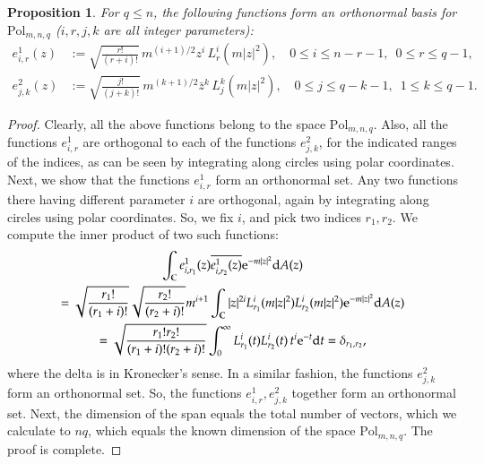 \documentclass{birkart}
\newtheorem{prop}[thm]{Proposition}
\theoremstyle{definition}
\theoremstyle{remark}
\numberwithin{equation}{section}
\numberwithin{figure}{section}
\newcommand{\e}{\mathrm e}
\newcommand{\1}{{\mathbf 1}}
\newcommand{\Rpar}{q}
\newcommand{\C}{{\mathbb C}}
\newcommand{\diff}{{\mathrm d}}
\begin{document}
\begin{prop} \label{on-kanta}
For $\Rpar\le n$, the following functions form an orthonormal basis for 
$\mathrm{Pol}_{m,n,\Rpar}$ ($i,r,j,k$ are all integer parameters): 
\begin{align*} 
e_{i,r}^{1}(z)&:=\sqrt{\frac{r!}{(r+i)!}} \,m^{(i+1)/2}z^i\, L_r^{i}(m|z|^2), 
\quad 0\leq i\leq n-r-1,\,\,\,0\leq r\leq\Rpar-1, 
\\
e_{j,k}^{2}(z)&:=\sqrt{\frac{j!}{(j+k)!}} 
\,m^{(k+1)/2}\bar{z}^k\, L^{k}_{j}(m|z|^2),
\quad 0\leq j\leq\Rpar-k-1,\,\,\,1\leq k\leq\Rpar-1. 
\end{align*}
\end{prop}
\begin{proof}
Clearly, all the above functions belong to the space 
$\mathrm{Pol}_{m,n,\Rpar}$. Also, all the functions $e^1_{i,r}$ are orthogonal
to each of the functions $e^2_{j,k}$, for the indicated ranges of the indices, 
as can be seen by integrating along circles using polar coordinates.
Next, we show that the functions $e^1_{i,r}$ form an orthonormal set.  
Any two functions there having different parameter $i$ are orthogonal, again
by integrating along circles using polar coordinates. 
So, we fix $i$, and pick two indices $r_1,r_2$. We compute the inner product 
of two such functions:
\begin{multline}
\int_\C e^1_{i,r_1}(z)\overline{e^1_{i,r_2}(z)}\e^{-m|z|^2} \diff A(z)
\\
=\sqrt{\frac{r_1!}{(r_1+i)!}} \sqrt{\frac{r_2!}{(r_2+i)!}}m^{i+1}
\int_{\C}
|z|^{2i}L_{r_1}^{i}(m|z|^2)L_{r_2}^{i}(m|z|^2) \e^{-m|z|^2} 
\diff A(z) \notag \\
=\sqrt{\frac{r_1!r_2!}{(r_1+i)!(r_2+i)!}} \int_{0}^{\infty} 
L_{r_1}^{i}(t) 
L_{r_2}^{i}(t)\,t^i\e^{-t} \diff t = \delta_{r_1,r_2},
\end{multline}
where the delta is in Kronecker's sense. In a similar fashion, 
the functions $e^2_{j,k}$ form an orthonormal set. 
So, the functions $e^1_{i,r},e^2_{j,k}$ together form an 
orthonormal set. Next, the dimension of the span equals the total number of
vectors, which we calculate to $n\Rpar$, which equals the known dimension 
of the space $\mathrm{Pol}_{m,n,\Rpar}$. The proof is complete. 
\end{proof}
\medskip
\end{document}
